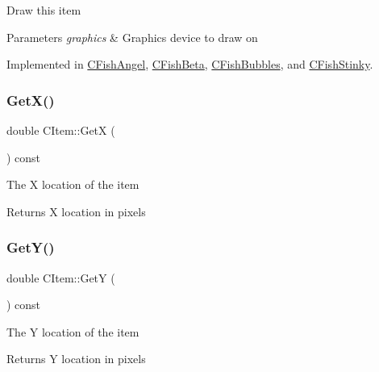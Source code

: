 Draw this item 
\begin{DoxyParams}{Parameters}
{\em graphics} & Graphics device to draw on \\
\hline
\end{DoxyParams}


Implemented in \mbox{\hyperlink{class_c_fish_angel_a242095541dc288d73ca583b61bc8f417}{C\+Fish\+Angel}}, \mbox{\hyperlink{class_c_fish_beta_a52e78e404e78d8b676c6b3a5916043eb}{C\+Fish\+Beta}}, \mbox{\hyperlink{class_c_fish_bubbles_aab256406ae44edb059c3acdaf07ebd12}{C\+Fish\+Bubbles}}, and \mbox{\hyperlink{class_c_fish_stinky_a48dd9938cc3750b6a2831a71dd8b6eb0}{C\+Fish\+Stinky}}.

\mbox{\label{class_c_item_a394d38a058fc53f0e958ca52248560c8}} 
\subsubsection{\texorpdfstring{GetX()}{GetX()}}
{\footnotesize\ttfamily double C\+Item\+::\+GetX (\begin{DoxyParamCaption}{ }\end{DoxyParamCaption}) const\hspace{0.3cm}{\ttfamily [inline]}}

The X location of the item \begin{DoxyReturn}{Returns}
X location in pixels 
\end{DoxyReturn}
\mbox{\label{class_c_item_ac0fe6be80f8ef19854d7f41b4803f658}} 
\subsubsection{\texorpdfstring{GetY()}{GetY()}}
{\footnotesize\ttfamily double C\+Item\+::\+GetY (\begin{DoxyParamCaption}{ }\end{DoxyParamCaption}) const\hspace{0.3cm}{\ttfamily [inline]}}

The Y location of the item \begin{DoxyReturn}{Returns}
Y location in pixels 
\end{DoxyReturn}
\mbox{\label{class_c_item_a8bd4f5e3f2eb2487125dd435719484e8}} 
